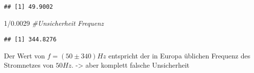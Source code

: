 \documentclass[
  9pt,
]{article}
\newenvironment{Shaded}{\begin{snugshade}}{\end{snugshade}}
\newcommand{\CommentTok}[1]{\textcolor[rgb]{0.56,0.35,0.01}{\textit{#1}}}
\newcommand{\DecValTok}[1]{\textcolor[rgb]{0.00,0.00,0.81}{#1}}
\newcommand{\FloatTok}[1]{\textcolor[rgb]{0.00,0.00,0.81}{#1}}
\newcommand{\SpecialCharTok}[1]{\textcolor[rgb]{0.00,0.00,0.00}{#1}}
\begin{document}
\begin{verbatim}
## [1] 49.9002
\end{verbatim}

\begin{Shaded}
\begin{Highlighting}[]
\DecValTok{1}\SpecialCharTok{/}\FloatTok{0.0029} \CommentTok{\#Unsicherheit Frequenz}
\end{Highlighting}
\end{Shaded}

\begin{verbatim}
## [1] 344.8276
\end{verbatim}

Der Wert von \(f= (50 \pm 340) Hz\) entspricht der in Europa üblichen
Frequenz des Stromnetzes von \(50 Hz\). -\textgreater{} aber komplett
falsche Unsicherheit
\end{document}
